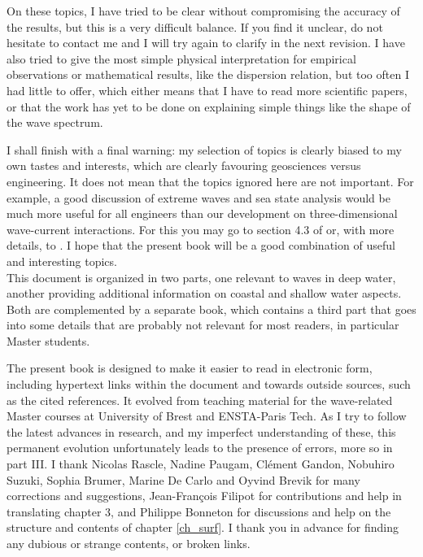 \documentclass[a4paper]{book}  %
\begin{document}
On these topics, I have tried to be clear without compromising the 
accuracy of the results, but this is a very difficult balance. If you find it unclear, do not hesitate to contact me
and I will try again to clarify in the next revision. I have also tried to give the most simple physical interpretation for empirical observations or mathematical results, like the dispersion relation, but too often I had little to offer, which either means 
that I have to read more scientific papers, or that the work has yet to be done on explaining simple things like the shape of the wave spectrum. 

 I shall finish with a final warning:  my selection of topics is clearly biased to my own tastes and 
interests, which are clearly favouring geosciences versus engineering. It does not mean that the topics ignored here are not important. 
For example, a good discussion of 
extreme waves and sea state analysis would be much more useful for all engineers 
than our development on three-dimensional wave-current interactions. For this you may go to section 4.3 of \cite{Holthuijsen2007} or, with more details, to \cite{Boccotti2000}.
I hope that the present book will be a good combination 
of useful and interesting topics. \\

\vspace{0.5cm}
This document is organized in two parts, one relevant to waves in deep water, another providing additional 
information on coastal and shallow water aspects. Both are complemented by a separate book, which contains a third part that goes into some details that are probably not relevant for 
most readers, in particular Master students. 

The present book is designed to make it easier to read in electronic form, including hypertext links within the document 
and towards outside sources, such as the cited references. It evolved from teaching material for the wave-related Master courses 
at University of Brest and ENSTA-Paris Tech. As I try to follow the latest 
advances in research, and my imperfect understanding of these, this permanent evolution unfortunately leads to the presence of errors, more so in part III. 
I thank 
Nicolas Rascle, Nadine Paugam, Cl{\'e}ment Gandon, Nobuhiro Suzuki, Sophia Brumer, Marine De Carlo and Oyvind Brevik for many corrections and suggestions, Jean-Fran{\c c}ois Filipot for contributions and help in translating chapter 3, and 
Philippe Bonneton for discussions and help on the structure and contents of chapter \ref{ch_surf}.  
I thank you in advance for finding any dubious or strange contents, or broken links.
\end{document}
